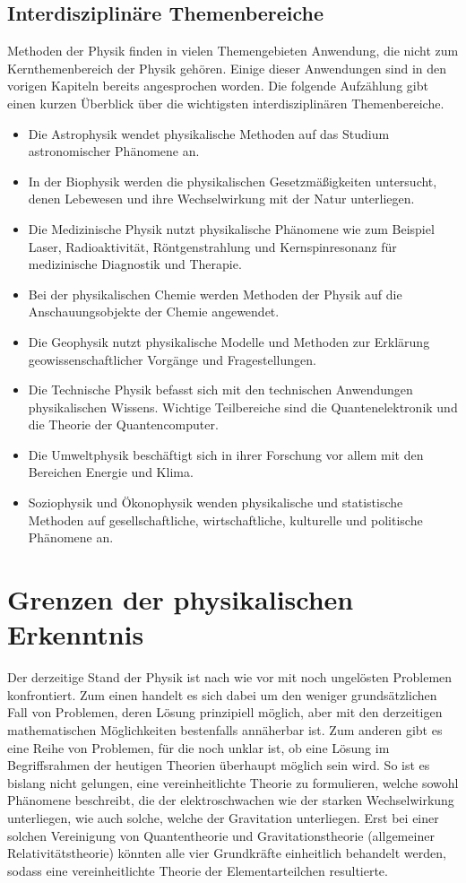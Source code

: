 \documentclass[titlepage, parkskip=full, twocolumn, landscape]{scrartcl}
\begin{document}
\subsection{Interdisziplinäre Themenbereiche}

Methoden der Physik finden in vielen Themengebieten Anwendung, die nicht zum Kern\-themen\-bereich der Physik gehören. Einige dieser Anwendungen sind in den vorigen Kapiteln bereits angesprochen worden. Die folgende Aufzählung gibt einen kurzen Überblick über die wichtigsten interdisziplinären Themenbereiche.
\begin{itemize}
	\item Die Astrophysik wendet physikalische Methoden auf das Studium astronomischer Phänomene an.
	\item In der Biophysik werden die physikalischen Gesetzmäßigkeiten untersucht, denen Lebewesen und ihre Wechselwirkung mit der Natur unterliegen.
	\item Die Medizinische Physik nutzt physikalische Phänomene wie zum Beispiel Laser, Radioaktivität, Röntgenstrahlung und Kernspinresonanz für medizinische Diagnostik und Therapie.
	\item Bei der physikalischen Chemie werden Methoden der Physik auf die Anschauungsobjekte der Chemie angewendet.
	\item Die Geophysik nutzt physikalische Modelle und Methoden zur Erklärung geowissenschaftlicher Vorgänge und Fragestellungen.
	\item Die Technische Physik befasst sich mit den technischen Anwendungen physikalischen Wissens. Wichtige Teilbereiche sind die Quantenelektronik und die Theorie der Quantencomputer.
	\item Die Umweltphysik beschäftigt sich in ihrer Forschung vor allem mit den Bereichen Energie und Klima.
	\item Soziophysik und Ökonophysik wenden physikalische und statistische Methoden auf gesellschaftliche, wirtschaftliche, kulturelle und politische Phänomene an.
\end{itemize}
\appendix
\section{Grenzen der physikalischen Erkenntnis}

Der derzeitige Stand der Physik ist nach wie vor mit noch ungelösten Problemen konfrontiert. Zum einen handelt es sich dabei um den weniger grundsätzlichen Fall von Problemen, deren Lösung prinzipiell möglich, aber mit den derzeitigen mathematischen Möglichkeiten bestenfalls annäherbar ist. Zum anderen gibt es eine Reihe von Problemen, für die noch unklar ist, ob eine Lösung im Begriffsrahmen der heutigen Theorien überhaupt möglich sein wird. So ist es bislang nicht gelungen, eine vereinheitlichte Theorie zu formulieren, welche sowohl Phänomene beschreibt, die der elektroschwachen wie der starken Wechselwirkung unterliegen, wie auch solche, welche der Gravitation unterliegen. Erst bei einer solchen Vereinigung von Quantentheorie und Gravitationstheorie (allgemeiner Relativitätstheorie) könnten alle vier Grundkräfte einheitlich behandelt werden, sodass eine vereinheitlichte Theorie der Elementarteilchen resultierte.
\end{document}
